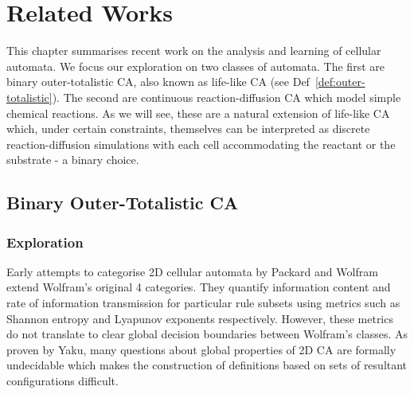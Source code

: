 \chapter{Related Works}

This chapter summarises recent work on the analysis and learning of cellular automata. We focus our exploration on two classes of automata. The first are binary outer-totalistic CA, also known as life-like CA (see Def~\ref{def:outer-totalistic}). The second are continuous reaction-diffusion CA which model simple chemical reactions. As we will see, these are a natural extension of life-like CA which, under certain constraints, themselves can be interpreted as discrete reaction-diffusion simulations with each cell accommodating the reactant or the substrate - a binary choice.


\section{Binary Outer-Totalistic CA}

\subsection{Exploration}

Early attempts to categorise 2D cellular automata by Packard and Wolfram\cite{packard1985two} extend Wolfram's original 4 categories. They quantify information content and rate of information transmission for particular rule subsets using metrics such as Shannon entropy and Lyapunov exponents respectively. However, these metrics do not translate to clear global decision boundaries between Wolfram's classes. As proven by Yaku\cite{yaku1973constructibility}, many questions about global properties of 2D CA are formally undecidable which makes the construction of definitions based on sets of resultant configurations difficult.


